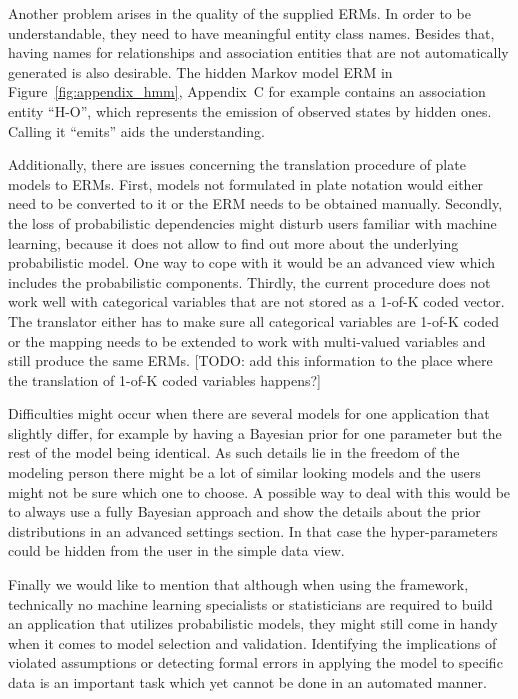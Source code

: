 Another problem arises in the quality of the supplied ERMs. In order to be understandable, they need to have meaningful entity class names. Besides that, having names for relationships and association entities that are not automatically generated is also desirable. The hidden Markov model ERM in Figure~\ref{fig:appendix_hmm}, Appendix~C for example contains an association entity ``H-O'', which represents the emission of observed states by hidden ones. Calling it ``emits'' aids the understanding.

Additionally, there are issues concerning the translation procedure of plate models to ERMs. First, models not formulated in plate notation would either need to be converted to it or the ERM needs to be obtained manually. Secondly, the loss of probabilistic dependencies might disturb users familiar with machine learning, because it does not allow to find out more about the underlying probabilistic model. One way to cope with it would be an advanced view which includes the probabilistic components. Thirdly, the current procedure does not work well with categorical variables that are not stored as a 1-of-K coded vector. The translator either has to make sure all categorical variables are 1-of-K coded or the mapping needs to be extended to work with multi-valued variables and still produce the same ERMs. [TODO: add this information to the place where the translation of 1-of-K coded variables happens?]

Difficulties might occur when there are several models for one application that slightly differ, for example by having a Bayesian prior for one parameter but the rest of the model being identical. As such details lie in the freedom of the modeling person there might be a lot of similar looking models and the users might not be sure which one to choose. A possible way to deal with this would be to always use a fully Bayesian approach and show the details about the prior distributions in an advanced settings section. In that case the hyper-parameters could be hidden from the user in the simple data view.

Finally we would like to mention that although when using the framework, technically no machine learning specialists or statisticians are required to build an application that utilizes probabilistic models, they might still come in handy when it comes to model selection and validation. Identifying the implications of violated assumptions or detecting formal errors in applying the model to specific data is an important task which yet cannot be done in an automated manner.

